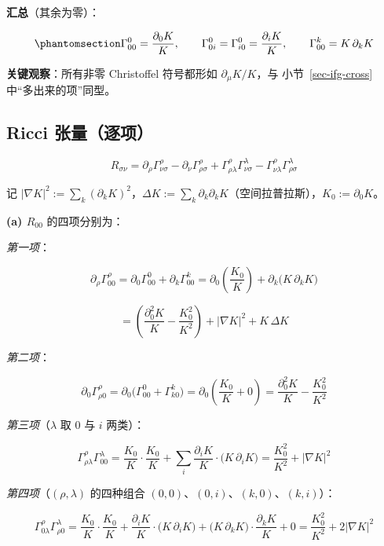\documentclass[
  chinese,
  a4paper,
  UTF8,
  12pt,
  oneside,
  openany]{ctexbook}
\theoremstyle{plain}
\theoremstyle{plain}
\theoremstyle{plain}
\theoremstyle{definition}
\theoremstyle{plain}
\theoremstyle{plain}
\theoremstyle{remark}
\begin{document}
\textbf{汇总}（其余为零）：

\begin{equation}\protect\phantomsection\label{eq-ifg-christoffel}{
\Gamma^{0}_{00}=\frac{\partial_0K}{K},\qquad
\Gamma^{0}_{0i}=\Gamma^{0}_{i0}=\frac{\partial_iK}{K},\qquad
\Gamma^{k}_{00}=K\,\partial_kK
}\end{equation}

\textbf{关键观察}：所有非零 Christoffel 符号都形如
\(\partial_\mu K/K\)，与 小节~\ref{sec-ifg-cross} 中``多出来的项''同型。

\subsection{Ricci 张量（逐项）}\label{ricci-ux5f20ux91cfux9010ux9879}

\[
R_{\sigma\nu}=\partial_\rho\Gamma^{\rho}_{\nu\sigma}
-\partial_\nu\Gamma^{\rho}_{\rho\sigma}
+\Gamma^{\rho}_{\rho\lambda}\Gamma^{\lambda}_{\nu\sigma}
-\Gamma^{\rho}_{\nu\lambda}\Gamma^{\lambda}_{\rho\sigma}
\]

记
\(\lvert\nabla K\rvert^{2}:=\sum_k(\partial_kK)^{2}\)，\(\Delta K:=\sum_k\partial_k\partial_kK\)（空间拉普拉斯），\(K_0:=\partial_0K\)。

\textbf{(a) \(R_{00}\)} 的四项分别为：

\emph{第一项}：

\[
\partial_\rho\Gamma^{\rho}_{00}
=\partial_0\Gamma^{0}_{00}+\partial_k\Gamma^{k}_{00}
=\partial_0\!\left(\frac{K_0}{K}\right)+\partial_k\bigl(K\,\partial_kK\bigr)
\]

\[
=\left(\frac{\partial_0^{2}K}{K}-\frac{K_0^{2}}{K^{2}}\right)+\lvert\nabla K\rvert^{2}+K\,\Delta K
\]

\emph{第二项}：

\[
\partial_0\Gamma^{\rho}_{\rho0}
=\partial_0\bigl(\Gamma^{0}_{00}+\Gamma^{k}_{k0}\bigr)
=\partial_0\!\left(\frac{K_0}{K}+0\right)
=\frac{\partial_0^{2}K}{K}-\frac{K_0^{2}}{K^{2}}
\]

\emph{第三项}（\(\lambda\) 取 \(0\) 与 \(i\) 两类）：

\[
\Gamma^{\rho}_{\rho\lambda}\Gamma^{\lambda}_{00}
=\frac{K_0}{K}\cdot\frac{K_0}{K}
+\sum_i\frac{\partial_iK}{K}\cdot\bigl(K\,\partial_iK\bigr)
=\frac{K_0^{2}}{K^{2}}+\lvert\nabla K\rvert^{2}
\]

\emph{第四项}（\((\rho,\lambda)\) 的四种组合
\((0,0)\)、\((0,i)\)、\((k,0)\)、\((k,i)\)）：

\[
\Gamma^{\rho}_{0\lambda}\Gamma^{\lambda}_{\rho0}
=\frac{K_0}{K}\cdot\frac{K_0}{K}
+\frac{\partial_iK}{K}\cdot\bigl(K\,\partial_iK\bigr)
+\bigl(K\,\partial_kK\bigr)\cdot\frac{\partial_kK}{K}
+0
=\frac{K_0^{2}}{K^{2}}+2\lvert\nabla K\rvert^{2}
\]
\end{document}

